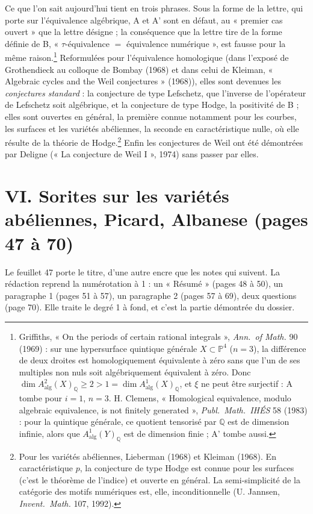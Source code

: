 \documentclass[11pt,a4paper]{article}
\begin{document}
Ce que l'on sait aujourd'hui tient en trois phrases. Sous la forme de la lettre,
qui porte sur l'équivalence algébrique, A et A' sont en défaut, au « premier cas
ouvert » que la lettre désigne ; la conséquence que la lettre tire de la forme
définie de B, « $\tau$-équivalence $=$ équivalence numérique », est fausse pour
la même raison.\footnote{Griffiths, « On the periods of certain rational
integrals », \emph{Ann.\ of Math.} 90 (1969) : sur une hypersurface quintique
générale $X \subset \mathbb{P}^{4}$ ($n = 3$), la différence de deux droites est
homologiquement équivalente à zéro sans que l'un de ses multiples non nuls soit
algébriquement équivalent à zéro. Donc $\dim
A^{2}_{\mathrm{alg}}(X)_{\mathbb{Q}} \geqslant 2 > 1 = \dim
A^{1}_{\mathrm{alg}}(X)_{\mathbb{Q}}$, et $\xi$ ne peut être surjectif : A
tombe pour $i = 1$, $n = 3$. H. Clemens, « Homological equivalence, modulo
algebraic equivalence, is not finitely generated », \emph{Publ.\ Math.\ IHÉS} 58
(1983) : pour la quintique générale, ce quotient tensorisé par $\mathbb{Q}$ est
de dimension infinie, alors que $A^{1}_{\mathrm{alg}}(Y)_{\mathbb{Q}}$ est de
dimension finie ; A' tombe aussi.} Reformulées pour l'équivalence homologique
(dans l'exposé de Grothendieck au colloque de Bombay (1968) et dans celui de
Kleiman, « Algebraic cycles and the Weil conjectures » (1968)), elles sont
devenues les \emph{conjectures standard} : la conjecture de type Lefschetz, que
l'inverse de l'opérateur de Lefschetz soit algébrique, et la conjecture de type
Hodge, la positivité de B ; elles sont ouvertes en général, la première connue
notamment pour les courbes, les surfaces et les variétés abéliennes, la seconde
en caractéristique nulle, où elle résulte de la théorie de
Hodge.\footnote{Pour les variétés abéliennes, Lieberman (1968) et Kleiman
(1968). En caractéristique $p$, la conjecture de type Hodge est connue pour les
surfaces (c'est le théorème de l'indice) et ouverte en général. La
semi-simplicité de la catégorie des motifs numériques est, elle, inconditionnelle
(U. Jannsen, \emph{Invent.\ Math.} 107, 1992).} Enfin les conjectures de Weil ont
été démontrées par Deligne (« La conjecture de Weil I », 1974) sans passer par
elles.

\section*{VI. Sorites sur les variétés abéliennes, Picard, Albanese (pages 47 à
70)}

Le feuillet 47 porte le titre, d'une autre encre que les notes qui suivent. La
rédaction reprend la numérotation à 1 : un « Résumé » (pages 48 à 50), un
paragraphe 1 (pages 51 à 57), un paragraphe 2 (pages 57 à 69), deux questions
(page 70). Elle traite le degré 1 à fond, et c'est la partie démontrée du
dossier.
\end{document}
